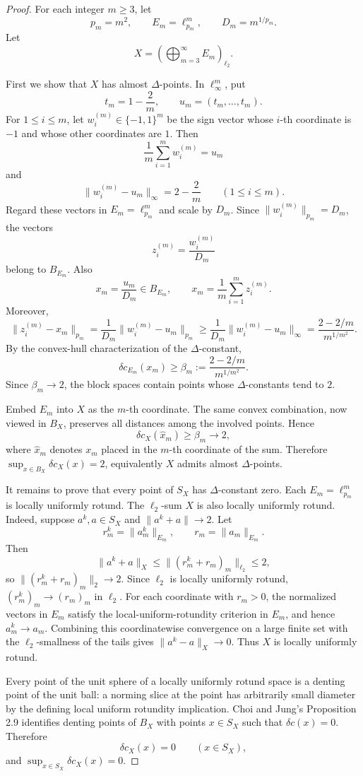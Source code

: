 \documentclass[11pt]{article}
\newcommand{\dec}{\delta c}
\begin{document}
\begin{proof}
For each integer \(m\ge 3\), let
\[
  p_m=m^2,\qquad E_m=\ell_{p_m}^m,\qquad D_m=m^{1/p_m}.
\]
Let
\[
  X=\left(\bigoplus_{m=3}^{\infty}E_m\right)_{\ell_2}.
\]

First we show that \(X\) has almost \(\Delta\)-points.  In \(\ell_\infty^m\),
put
\[
  t_m=1-\frac2m,\qquad u_m=(t_m,\ldots,t_m).
\]
For \(1\le i\le m\), let \(w_i^{(m)}\in\{-1,1\}^m\) be the sign vector whose
\(i\)-th coordinate is \(-1\) and whose other coordinates are \(1\).  Then
\[
  \frac1m\sum_{i=1}^m w_i^{(m)}=u_m
\]
and
\[
  \|w_i^{(m)}-u_m\|_\infty=2-\frac2m
  \qquad (1\le i\le m).
\]
Regard these vectors in \(E_m=\ell_{p_m}^m\) and scale by \(D_m\).  Since
\(\|w_i^{(m)}\|_{p_m}=D_m\), the vectors
\[
  z_i^{(m)}=\frac{w_i^{(m)}}{D_m}
\]
belong to \(B_{E_m}\).  Also
\[
  x_m=\frac{u_m}{D_m}\in B_{E_m},\qquad
  x_m=\frac1m\sum_{i=1}^m z_i^{(m)}.
\]
Moreover,
\[
  \|z_i^{(m)}-x_m\|_{p_m}
  =\frac1{D_m}\|w_i^{(m)}-u_m\|_{p_m}
  \ge \frac1{D_m}\|w_i^{(m)}-u_m\|_\infty
  =\frac{2-2/m}{m^{1/m^2}}.
\]
By the convex-hull characterization of the \(\Delta\)-constant,
\[
  \dec_{E_m}(x_m)\ge
  \beta_m:=\frac{2-2/m}{m^{1/m^2}}.
\]
Since \(\beta_m\to 2\), the block spaces contain points whose
\(\Delta\)-constants tend to \(2\).

Embed \(E_m\) into \(X\) as the \(m\)-th coordinate.  The same convex
combination, now viewed in \(B_X\), preserves all distances among the involved
points.  Hence
\[
  \dec_X(\widehat{x}_m)\ge \beta_m\to 2,
\]
where \(\widehat{x}_m\) denotes \(x_m\) placed in the \(m\)-th coordinate of
the sum.  Therefore \(\sup_{x\in B_X}\dec_X(x)=2\), equivalently \(X\) admits
almost \(\Delta\)-points.

It remains to prove that every point of \(S_X\) has \(\Delta\)-constant zero.
Each \(E_m=\ell_{p_m}^m\) is locally uniformly rotund.  The \(\ell_2\)-sum
\(X\) is also locally uniformly rotund.  Indeed, suppose \(a^k,a\in S_X\) and
\(\|a^k+a\|\to 2\).  Let
\[
  r_m^k=\|a_m^k\|_{E_m},\qquad r_m=\|a_m\|_{E_m}.
\]
Then
\[
  \|a^k+a\|_X
  \le \|(r_m^k+r_m)_m\|_{\ell_2}\le 2,
\]
so \(\|(r_m^k+r_m)_m\|_2\to 2\).  Since \(\ell_2\) is locally uniformly
rotund, \((r_m^k)_m\to (r_m)_m\) in \(\ell_2\).  For each coordinate with
\(r_m>0\), the normalized vectors in \(E_m\) satisfy the local-uniform-rotundity
criterion in \(E_m\), and hence \(a_m^k\to a_m\).  Combining this coordinatewise
convergence on a large finite set with the \(\ell_2\)-smallness of the tails
gives \(\|a^k-a\|_X\to 0\).  Thus \(X\) is locally uniformly rotund.

Every point of the unit sphere of a locally uniformly rotund space is a denting
point of the unit ball: a norming slice at the point has arbitrarily small
diameter by the defining local uniform rotundity implication.  Choi and Jung's
Proposition 2.9 identifies denting points of \(B_X\) with points \(x\in S_X\)
such that \(\dec(x)=0\).  Therefore
\[
  \dec_X(x)=0\qquad (x\in S_X),
\]
and \(\sup_{x\in S_X}\dec_X(x)=0\).
\end{proof}
\end{document}

